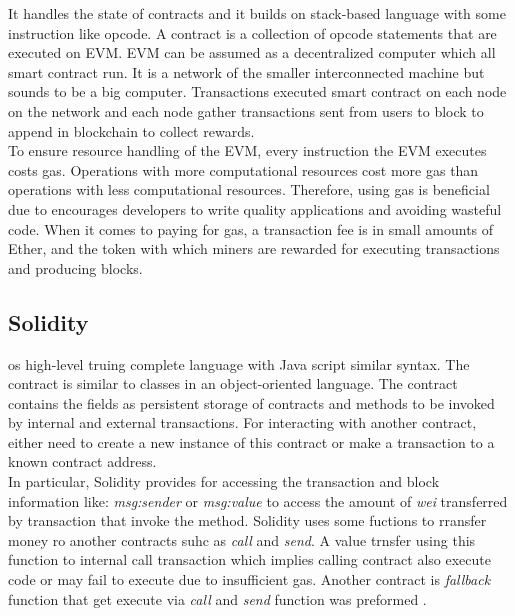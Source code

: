 It handles the state of contracts and it builds on stack-based language with some instruction like opcode. A contract is a collection of opcode statements that are executed on EVM.  EVM can be assumed as a decentralized computer which all smart contract run. It is a network of the smaller interconnected machine but sounds to be a big computer. Transactions executed smart contract on each node on the network and each node gather transactions sent from users to block to append in blockchain to collect rewards.\\
To ensure resource handling of the EVM,  every instruction the EVM executes costs gas. Operations with more computational resources cost more gas than operations with less computational resources. Therefore, using gas is beneficial due to encourages developers to write quality applications and avoiding wasteful code. When it comes to paying for gas, a transaction fee is in small amounts of Ether, and the token with which miners are rewarded for executing transactions and producing blocks\cite{Zdun}. 
\subsection{Solidity} os high-level truing complete language with Java script similar syntax. The contract is similar to classes in an object-oriented language. The contract contains the fields as persistent storage of contracts and methods to be invoked by internal and external transactions. For interacting with another contract, either need to create a new instance of this contract or make a transaction to a known contract address.\\
In particular, Solidity provides for accessing the transaction and block information like: \textit{msg:sender} or \textit{msg:value} to access the amount of \textit{wei} transferred by transaction that invoke the method. Solidity uses some fuctions to rransfer money ro another contracts suhc as \textit{call} and \textit{send}. A value trnsfer using this function to internal call transaction which implies calling contract also execute code or may fail to execute due to insufficient gas. Another contract is \textit{fallback} function that get execute via \textit{call} and \textit{send} function was preformed \cite{Ilya}.

